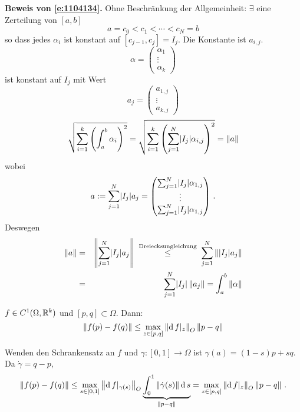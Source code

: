 \begin{Bew}
{\bf Beweis von \eqref{e:1104134}.}  Ohne Beschränkung der Allgemeinheit: $\exists$ eine Zerteilung von $[a,b]$ 
  \[a=c_0<c_1<\cdots<c_N=b\]
so dass  jedes $\alpha_i$ ist konstant auf $[c_{j-1},c_j]=I_j$. Die Konstante ist $a_{i,j}$.
  \[\alpha = \begin{pmatrix}
    \alpha_1\\ \vdots \\ \alpha_k
  \end{pmatrix}\]
  ist konstant auf $I_j$ mit Wert
  \[a_j = \begin{pmatrix}
    a_{1,j}\\ \vdots \\ a_{k,j}
  \end{pmatrix}\]
  \[\sqrt{\sum_{i=1}^k\left( \int_a^b\alpha_i \right)^2}=\sqrt{\sum_{i=1}^k\left( \sum_{j=1}^N\mathopen| I_j \mathclose|\alpha_{i,j} \right)^2}=\left\| a \right\|\]
wobei
\[
    a:=\sum_{j=1}^N\mathopen| I_j \mathclose|a_j
    = \begin{pmatrix}
      \sum_{j=1}^N\mathopen| I_j \mathclose|\alpha_{1,j}\\
      \vdots \\
      \sum_{j=1}^N\mathopen| I_j \mathclose|\alpha_{1,j}\\
    \end{pmatrix}\, .
\]
Deswegen
\begin{eqnarray*}
\|a\|   &=& \left\| \sum_{j=1}^N\mathopen| I_j \mathclose|a_j \right\|
\;\stackrel{\text{Dreiecksungleichung}}{\leq}\;\sum_{j=1}^N\left\| \mathopen| I_j \mathclose|a_j \right\|\nonumber\\
& =&\sum_{j=1}^N\mathopen| I_j \mathclose|\left\| a_j \right\|=\int_a^b\left\| \alpha \right\|
 \end{eqnarray*}
\end{Bew}

\begin{Kor}
  $f\in C^1(\Omega, \mathbb{R}^k)$ und $[p,q]\subset\Omega$. Dann:
  \[\left\| f(p)-f(q) \right\|\leq\max_{z\in [p,q]}\left\| \operatorname{d} f|_z \right\|_O \left\| p-q \right\|\]
\end{Kor}
\begin{Bew}
  Wenden den Schrankensatz an $f$ und $\gamma:[0,1]\to\Omega$ ist $\gamma(a)=(1-s)p+sq$.
Da $\dot \gamma=q-p$,
  \begin{eqnarray*}
    \left\| f(p)-f(q) \right\|\leq
    \max_{s\in [0,1]}\left\| \operatorname{d} f|_{\gamma(s)} \right\|_O \underbrace{\int_0^1\left\| \dot\gamma(s) \right\|\operatorname{d} s}_{\left\| p-q \right\|}
= \max_{z\in [p,q]}\left\| \operatorname{d} f|_z \right\|_O \left\| p-q \right\|\, .
  \end{eqnarray*}
\end{Bew}
